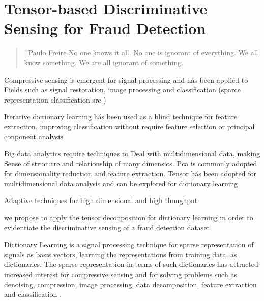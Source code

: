 \chapter{Tensor-based Discriminative Sensing for Fraud Detection}
\label{ch:tensor_dl}

\begin{quotation}[]{Paulo Freire}
No one knows it all. No one is ignorant of everything. We all know something. We are all ignorant of something.
\end{quotation}

Compressive sensing is emergent for signal processing and hás been applied to Fields such as signal restoration, image processing and classification (sparce representation classification src )

Iterative dictionary learning hás been used as a blind technique for feature extraction, improving classification without require feature selection or principal conponent analysis

Big data analytics require techniques to Deal with multidimensional data, making Sense of strucutre and relationship of many dimensios. Pca is commonly adopted for dimensionality reduction and feature extraction. Tensor hás been adopted for multidimensional data analysis and can be explored for dictionary learning

Adaptive techniques for high dimensional and high thoughput

we propose to apply the tensor deconposition for dictionary learning in order to evidentiate the discriminative sensing of a fraud detection dataset

Dictionary Learning is a signal processing technique for sparse representation of signals as basis vectors, learning the representations from training data, as dictionaries. The sparse representation in terms of such dictionaries has attracted increased interest for compressive sensing and for solving problems such as denoising, compression, image processing, data decomposition, feature extraction and classification \cite{tosic2011dictionary, zhang2010discriminative, zhu2016coupled,ravishankar2011mr}.

